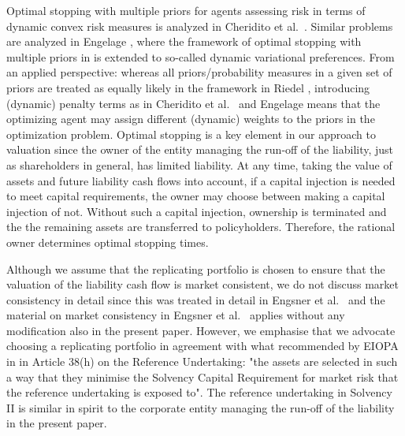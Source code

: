 \documentclass[11pt,a4paper]{article}
\begin{document}
Optimal stopping with multiple priors for agents assessing risk in terms of dynamic convex risk measures is analyzed in Cheridito et al.~\cite{Cheridito-Delbaen-Kupper-06}. Similar problems are analyzed in Engelage \cite{Engelage-11}, where the framework of optimal stopping with multiple priors in \cite{Riedel-09} is extended to so-called dynamic variational preferences. From an applied perspective: whereas all priors/probability measures in a given set of priors are treated as equally likely in the framework in Riedel \cite{Riedel-09}, introducing (dynamic) penalty terms as in Cheridito et al.~\cite{Cheridito-Delbaen-Kupper-06} and Engelage \cite{Engelage-11} means that the optimizing agent may assign different (dynamic) weights to the priors in the optimization problem. Optimal stopping is a key element in our approach to valuation since the owner of the entity managing the run-off of the liability, just as shareholders in general, has limited liability. At any time, taking the value of assets and future liability cash flows into account, if a capital injection is needed to meet capital requirements, the owner may choose between making a capital injection of not. Without such a capital injection, ownership is terminated and the the remaining assets are transferred to policyholders. Therefore, the rational owner determines optimal stopping times.    

Although we assume that the replicating portfolio is chosen to ensure that the valuation of the liability cash flow is market consistent, we do not discuss market consistency in detail since this was treated in detail in Engsner et al.~\cite{Engsner-Lindensjo-Lindskog-20} and the material on market consistency in Engsner et al.~\cite{Engsner-Lindensjo-Lindskog-20} applies without any modification also in the present paper. However, we emphasise that we advocate choosing a replicating portfolio in agreement with what recommended by EIOPA in \cite[Article 38]{Commission-del-reg-15} in Article 38(h) on the Reference Undertaking: "the assets are selected in such a way that they minimise the Solvency Capital Requirement for market risk that the reference undertaking is exposed to". The reference undertaking in Solvency II is similar in spirit to the corporate entity managing the run-off of the liability in the present paper. 
\end{document}
